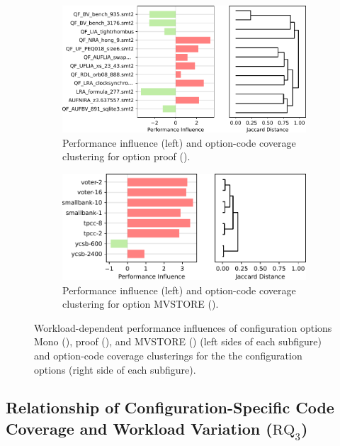 {{{\begin{figure}
	\begin{subfigure}{\linewidth}
		\centering
		\vspace{2em}
		\includegraphics[width=0.97\linewidth]{images/proof.pdf}
		\caption{Performance influence (left) and option-code coverage clustering for option \textsf{proof} (\zdrei).}
		\label{fig:proof_z3}
	\end{subfigure}

	\begin{subfigure}{\linewidth}
		\centering
		\vspace{2em}
		\includegraphics[width=0.97\linewidth]{images/MVSTORE.pdf}
		\caption{Performance influence (left) and option-code coverage clustering for option \textsf{MVSTORE} (\htwo).}
		\label{fig:mvstore_h2}
	\end{subfigure}
\caption{Workload-dependent performance influences of configuration options \textsf{Mono} (\jumper), \textsf{proof} (\zdrei), and \textsf{MVSTORE} (\htwo) (left sides of each subfigure) and option-code coverage clusterings for the the configuration options (right side of each subfigure).}
\end{figure}

\subsection{Relationship of Configuration-Specific Code Coverage and Workload Variation ($\text{RQ}_\text{3}$)}\label{sec:rq3}\label{sec:categories}
}}}
